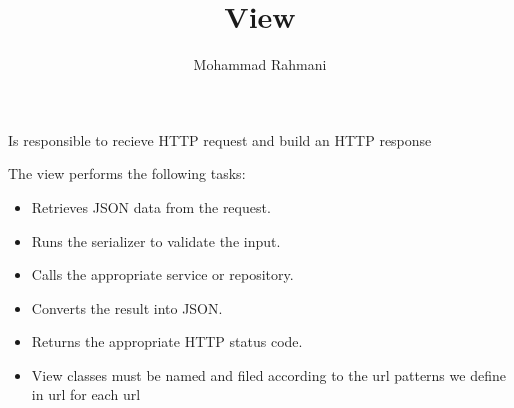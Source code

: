 \documentclass[a4paper]{article}
\title{View}
\date{}
\author{Mohammad Rahmani}
\begin{document}
    \maketitle
    Is responsible to recieve HTTP request and build an HTTP response
    
    The view performs the following tasks:
    
    \begin{itemize}
        \item Retrieves JSON data from the request.
        \item Runs the serializer to validate the input.
        \item Calls the appropriate service or repository.
        \item Converts the result into JSON.
        \item Returns the appropriate HTTP status code.
        \item View classes must be named and filed according to the url patterns we define in url for each url
    \end{itemize}
    
    
\end{document}
